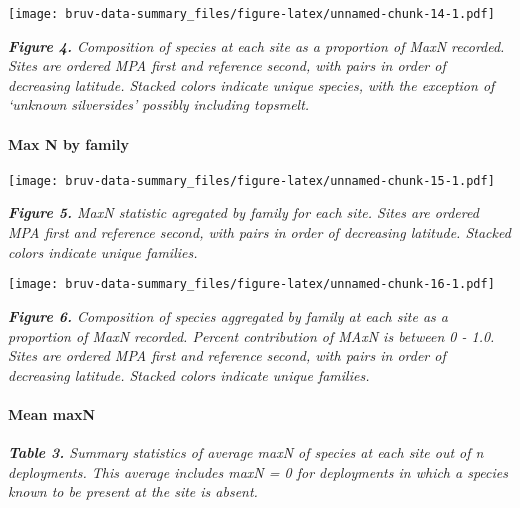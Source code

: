 \documentclass[]{article}
\let\oldparagraph\paragraph
\renewcommand{\paragraph}[1]{\oldparagraph{#1}\mbox{}}
\begin{document}
\texttt{[image: bruv-data-summary\_files/figure-latex/unnamed-chunk-14-1.pdf]}

\emph{\textbf{Figure 4.} Composition of species at each site as a
proportion of MaxN recorded. Sites are ordered MPA first and reference
second, with pairs in order of decreasing latitude. Stacked colors
indicate unique species, with the exception of `unknown silversides'
possibly including topsmelt.}

\paragraph{Max N by family}\label{max-n-by-family}

\texttt{[image: bruv-data-summary\_files/figure-latex/unnamed-chunk-15-1.pdf]}

\emph{\textbf{Figure 5. } MaxN statistic agregated by family for each
site. Sites are ordered MPA first and reference second, with pairs in
order of decreasing latitude. Stacked colors indicate unique families.}

\texttt{[image: bruv-data-summary\_files/figure-latex/unnamed-chunk-16-1.pdf]}

\emph{\textbf{Figure 6.} Composition of species aggregated by family at
each site as a proportion of MaxN recorded. Percent contribution of MAxN
is between 0 - 1.0. Sites are ordered MPA first and reference second,
with pairs in order of decreasing latitude. Stacked colors indicate
unique families.}

\paragraph{Mean maxN}\label{mean-maxn}

\emph{\textbf{Table 3.} Summary statistics of average maxN of species at
each site out of n deployments. This average includes maxN = 0 for
deployments in which a species known to be present at the site is
absent.}
\end{document}
